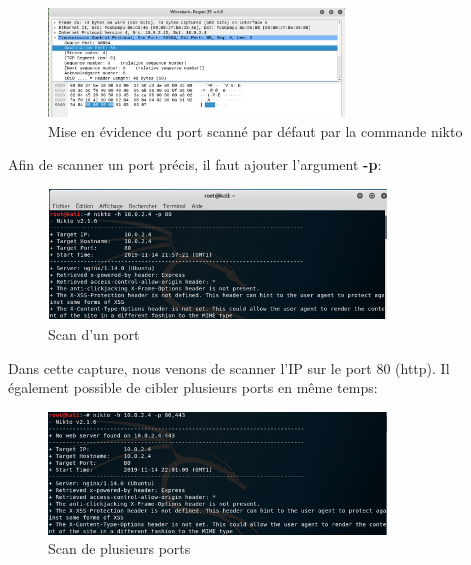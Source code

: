 \begin{figure}[htp!]
  \centering
  \setlength\figureheight{7cm}
  \setlength\figurewidth{9cm}
  \includegraphics[width=0.7\textwidth]{oui/Ancien/imangeancien/Nikto/wireshark3.png}
  \caption{Mise en évidence du port scanné par défaut par la commande nikto}
  \label{fig:courbe-tikz}
\end{figure}

\newpage

Afin de scanner un port précis, il faut ajouter l'argument \textbf{-p}: 

\begin{figure}[htp!]
  \centering
  \setlength\figureheight{7cm}
  \setlength\figurewidth{9cm}
  \includegraphics[width=0.8\textwidth]{oui/Ancien/imangeancien/Nikto/2.PNG}
  \caption{Scan d'un port}
  \label{fig:courbe-tikz}
\end{figure}

Dans cette capture, nous venons de scanner l'IP sur le port 80 (http). Il également possible de cibler plusieurs ports en même temps:


\begin{figure}[htp!]
  \centering
  \setlength\figureheight{7cm}
  \setlength\figurewidth{9cm}
  \includegraphics[width=0.8\textwidth]{oui/Ancien/imangeancien/Nikto/3.PNG}
  \caption{Scan de plusieurs ports}
  \label{fig:courbe-tikz}
\end{figure}

